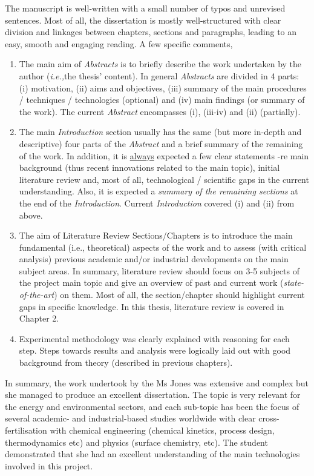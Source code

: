 \documentclass[14pt,twoside]{report}
\newcommand{\ie}{{\it i.e.,}}
\begin{document}
The manuscript is well-written with a small number of typos and unrevised sentences. Most of all, the dissertation is mostly well-structured with clear division and linkages between chapters, sections and paragraphs, leading to an easy, smooth and engaging reading. A few specific comments,
\begin{enumerate}
%
\item The main aim of {\it Abstracts} is to briefly describe the work undertaken by the author (\ie the thesis' content). In general {\it Abstracts} are divided in 4 parts: (i) motivation, (ii) aims and objectives, (iii) summary of the main procedures / techniques / technologies (optional) and (iv) main findings (or summary of the work). The current {\it Abstract} encompasses (i), (iii-iv) and (ii) (partially).
%
\item The main {\it Introduction} section usually has the same (but more in-depth and descriptive) four parts of the {\it Abstract} and a brief summary of the remaining of the work. In addition, it is \underline{always} expected a few clear statements -re main background (thus recent innovations related to the main topic), initial literature review and, most of all, technological / scientific gaps in the current understanding. Also, it is expected a {\it summary of the remaining sections} at the end of the {\it Introduction}.  Current {\it Introduction} covered (i) and (ii) from above.
%
\item The aim of Literature Review Sections/Chapters is to introduce the main fundamental (i.e., theoretical) aspects of the work and to assess (with critical analysis) previous academic and/or industrial developments on the main subject areas. In summary, literature review should focus on 3-5 subjects of the project main topic and give an overview of past and current work ({\it state-of-the-art}) on them. Most of all, the section/chapter should highlight current gaps in specific knowledge. In this thesis, literature review is covered in Chapter 2.
%
\item Experimental methodology was clearly explained with reasoning for each step. Steps towards results and analysis were logically laid out with good background from theory (described in previous chapters).
%
\end{enumerate}
In summary, the work undertook by the Ms Jones was extensive and complex but she managed to produce an excellent dissertation. The topic is very relevant for the energy and environmental sectors, and each sub-topic has been the focus of several academic- and industrial-based studies worldwide with clear cross-fertilisation with chemical engineering (chemical kinetics, process design, thermodynamics etc) and physics (surface chemistry, etc). The student demonstrated that she had an excellent understanding of the main technologies involved in this project.
\end{document}
